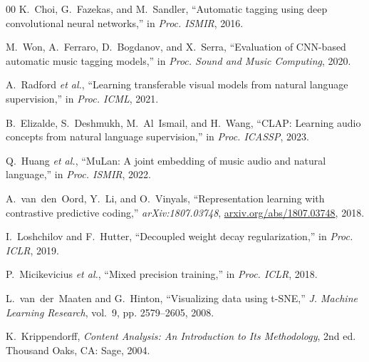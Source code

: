 \documentclass[conference]{IEEEtran}
\begin{document}
\begin{thebibliography}{00}
 K.~Choi, G.~Fazekas, and M.~Sandler, ``Automatic tagging
using deep convolutional neural networks,'' in \emph{Proc. ISMIR}, 2016.

 M.~Won, A.~Ferraro, D.~Bogdanov, and X.~Serra,
``Evaluation of CNN-based automatic music tagging models,'' in \emph{Proc.
Sound and Music Computing}, 2020.

 A.~Radford \emph{et al.}, ``Learning transferable
visual models from natural language supervision,'' in \emph{Proc. ICML}, 2021.

 B.~Elizalde, S.~Deshmukh, M.~Al~Ismail, and
H.~Wang, ``CLAP: Learning audio concepts from natural language supervision,''
in \emph{Proc. ICASSP}, 2023.

 Q.~Huang \emph{et al.}, ``MuLan: A joint embedding of
music audio and natural language,'' in \emph{Proc. ISMIR}, 2022.

 A.~van~den~Oord, Y.~Li, and O.~Vinyals,
``Representation learning with contrastive predictive coding,''
\emph{arXiv:1807.03748}, \href{https://arxiv.org/abs/1807.03748}{arxiv.org/abs/1807.03748}, 2018.

 I.~Loshchilov and F.~Hutter, ``Decoupled weight
decay regularization,'' in \emph{Proc. ICLR}, 2019.

 P.~Micikevicius \emph{et al.}, ``Mixed precision
training,'' in \emph{Proc. ICLR}, 2018.

 L.~van~der~Maaten and G.~Hinton, ``Visualizing data
using t-SNE,'' \emph{J. Machine Learning Research}, vol.~9, pp. 2579--2605,
2008.

 K.~Krippendorff, \emph{Content Analysis: An
Introduction to Its Methodology}, 2nd ed. Thousand Oaks, CA: Sage, 2004.

\end{thebibliography}

\appendices
\end{document}
